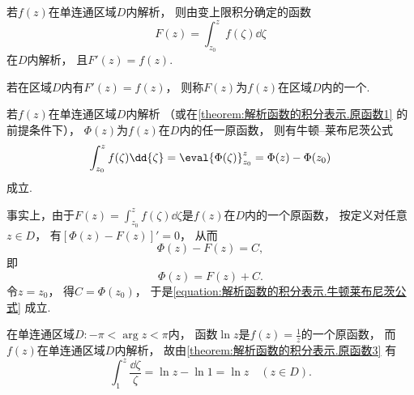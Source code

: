 \begin{corollary}\label{theorem:解析函数的积分表示.原函数2}
若\(f(z)\)在单连通区域\(D\)内解析，
则由变上限积分确定的函数\begin{equation*}
	F(z) = \int_{z_0}^z f(\zeta) \dd{\zeta}
\end{equation*}在\(D\)内解析，
且\(F'(z) = f(z)\).
\end{corollary}

\begin{definition}
若在区域\(D\)内有\(F'(z)=f(z)\)，
则称\(F(z)\)为\(f(z)\)在区域\(D\)内的一个.
\end{definition}

\begin{corollary}\label{theorem:解析函数的积分表示.原函数3}
若\(f(z)\)在单连通区域\(D\)内解析
（或在\cref{theorem:解析函数的积分表示.原函数1} 的前提条件下），
\(\Phi(z)\)为\(f(z)\)在\(D\)内的任一原函数，
则有牛顿--莱布尼茨公式
\begin{equation}\label{equation:解析函数的积分表示.牛顿莱布尼茨公式}
	\int_{z_0}^z f(\zeta) \dd{\zeta}
	= \eval{\Phi(\zeta)}_{z_0}^z
	= \Phi(z)-\Phi(z_0)
\end{equation}成立.
\end{corollary}
事实上，由于\(F(z) = \int_{z_0}^z f(\zeta) \dd{\zeta}\)是\(f(z)\)在\(D\)内的一个原函数，
按定义对任意\(z \in D\)，
有\([\Phi(z) - F(z)]'=0\)，
从而\begin{equation*}
	\Phi(z) - F(z) = C,
\end{equation*}
即\begin{equation*}
	\Phi(z) = F(z) + C.
\end{equation*}
令\(z=z_0\)，
得\(C = \Phi(z_0)\)，
于是\cref{equation:解析函数的积分表示.牛顿莱布尼茨公式} 成立.

\begin{example}
在单连通区域\(D: -\pi<\arg z<\pi\)内，
函数\(\ln z\)是\(f(z) = \frac{1}{z}\)的一个原函数，
而\(f(z)\)在单连通区域\(D\)内解析，
故由\cref{theorem:解析函数的积分表示.原函数3} 有\begin{equation*}
	\int_1^z \frac{\dd{\zeta}}{\zeta}
	= \ln z - \ln 1
	= \ln z \quad(z \in D).
\end{equation*}
\end{example}

